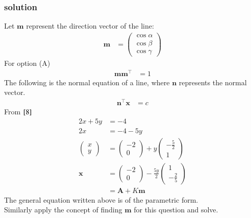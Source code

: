 \documentclass[journal,12pt,onecolumn]{IEEEtran}
\theoremstyle{remark}
\begin{document}
\subsubsection{solution}
Let $\textbf{m}$ represent the direction vector of the line:
\begin{align}
    \textbf{m} &= \begin{pmatrix}
        \cos{\alpha} \\
        \cos{\beta}\\
        \cos{\gamma}
    \end{pmatrix}
\end{align}
For option (A)
\begin{align}
\textbf{m}\textbf{m}^{\top} &= 1
\end{align}
The following is the normal equation of a line, where $\textbf{n}$ represents the normal vector.
\begin{align}
    \textbf{n}^{\top}\textbf{x} &= c
\end{align}
From $\eqref{8}$
\begin{align}
    2x + 5y &= -4\\
    2x &= -4 -5y\\
    \begin{pmatrix}
        x\\
        y
    \end{pmatrix} &= \begin{pmatrix}
        -2\\
        0
    \end{pmatrix} + y\begin{pmatrix}
        -\frac{5}{2}\\
        1
    \end{pmatrix}\\
    \textbf{x} &= \begin{pmatrix}
        -2\\
        0
    \end{pmatrix} -\frac{5y}{2}\begin{pmatrix}
        1\\
        -\frac{2}{5}
    \end{pmatrix}\\
    &= \textbf{A} + K\textbf{m} \label{11}
\end{align}
The general equation written above is of the parametric form.\\
Similarly apply the concept of finding $\textbf{m}$ for this question and solve.
\end{document}

